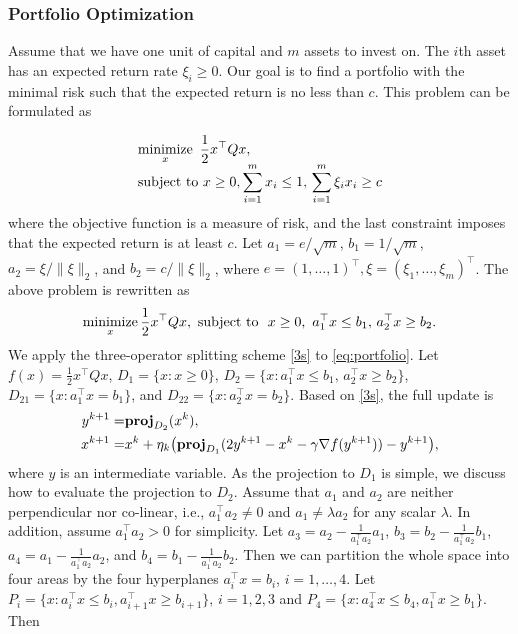 \subsubsection{Portfolio Optimization}
Assume that we have one unit of capital and $m$ assets to invest on. The $i$th asset has an expected return rate $\xi_i\ge 0$. Our goal is to find a portfolio with the minimal risk such that the expected return is no less than $c$. This problem can be formulated as

\begin{equation*}
\begin{array}{l}
\displaystyle
\Min_x ~ \frac{1}{2} x^\top Q x, \\
\displaystyle
\text{subject to}~ x\ge0, \sum_{i=1}^m x_i\le 1,\, \sum_{i=1}^m\xi_i x_i\ge c
\end{array}
\end{equation*}
where the objective function is a measure of risk, and the last constraint imposes that the expected return is at least $c$. Let $a_1=e/\sqrt{m}$, $b_1=1/\sqrt{m}$, $a_2=\xi/\|\xi\|_2$, and $b_2=c/\|\xi\|_2$, where $e = (1, \dots, 1)^\top, \xi = (\xi_1, \dots, \xi_m)^\top$. The above problem is rewritten as
\begin{equation}\label{eq:portfolio}
\Min_x \frac{1}{2} x^\top Q x,\ \text{subject to }\ x\ge0, ~a_1^\top x\le b_1,\, a_2^\top x\ge b_2.
\end{equation}
We apply the three-operator splitting scheme \eqref{3s} to \eqref{eq:portfolio}. Let $f(x)=\frac{1}{2}x^\top Q x$, $D_1=\{x: x\ge 0\}$, $D_2=\{x: a_1^\top x \le b_1,\, a_2^\top x\ge b_2\}$, $D_{21}=\{x: a_1^\top x=b_1\}$, and $D_{22}=\{x: a_2^\top x=b_2\}$. Based on \eqref{3s}, the full update is
\begin{subequations}\label{eq:3op-portfolio}
\begin{align}
y^{k+1}=&\prj_{D_2}(x^k),\\
x^{k+1}=&x^k+\eta_k\big(\prj_{D_1}(2y^{k+1}-x^k-\gamma \nabla f(y^{k+1}))-y^{k+1}\big), \end{align}
\end{subequations}
where $y$ is an intermediate variable. As the projection to $D_1$ is simple, we discuss how to evaluate the projection to $D_2$. Assume that $a_1$ and $a_2$ are neither perpendicular nor co-linear, i.e., $a_1^\top a_2\neq 0$ and $a_1\neq \lambda a_2$ for any scalar $\lambda$. In addition, assume $a_1^\top a_2>0$ for simplicity. Let $a_3=a_2-\frac{1}{a_1^\top a_2} a_1$, $b_3=b_2-\frac{1}{a_1^\top a_2} b_1$, $a_4=a_1-\frac{1}{a_1^\top a_2} a_2$, and $b_4=b_1-\frac{1}{a_1^\top a_2} b_2$. Then we can partition the whole space into four areas by the four hyperplanes $a_i^\top x=b_i$, $i=1,\ldots,4$. Let $P_i=\{x: a_i^\top x\le b_i, a_{i+1}^\top x\ge b_{i+1}\},\, i=1,2,3$ and $P_4=\{x: a_4^\top x\le b_4, a_1^\top x\ge b_1\}$. Then
